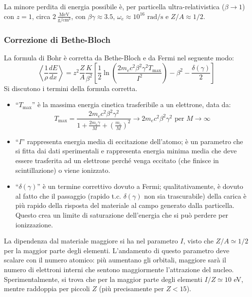 \documentclass[10pt, a4paper]{scrartcl}
\numberwithin{equation}{subsection}
\theoremstyle{style1}
\begin{document}
La minore perdita di energia possibile \`e, per particella ultra-relativistica ($\beta \to 1$) con $z=1$, circa $2 \ \frac{\text{MeV}}{\text{g} / \text{cm}^2}$, con $\beta \gamma\approx 3.5$, $\omega_e \approx 10^{16} \text{ rad} / \text{s}$ e $Z / A \approx 1 / 2$.


\subsubsection{Correzione di Bethe-Bloch }

La formula di Bohr \`e corretta da Bethe-Bloch e da Fermi nel seguente modo:
\begin{equation}
	\left\langle \frac{1}{\rho } \frac{d E}{d x}  \right\rangle = z^2 \frac{Z}{A} \frac{K}{\beta ^2} \left[ \frac{1}{2} \ln \left(\frac{2 m_e c^2 \beta ^2 \gamma^2 T_\text{max}}{I^2}\right)  - \beta ^2 - \frac{\delta (\gamma)}{2} \right] 
\end{equation}
Si discutono i termini della formula corretta.
\begin{itemize}
	\item ``$T_\text{max}$'' \`e la massima energia cinetica trasferibile a un elettrone, data da:
		\begin{equation}
			T_\text{max} = \frac{2m_e c^2 \beta ^2 \gamma^2}{1 + \frac{2 m_e \gamma}{M} + \left(\frac{m_e}{M}\right) ^2} \to 2 m_e c^2 \beta ^2 \gamma^2 \text{ per } M \to \infty
		\end{equation}
	\item ``$I$'' rappresenta energia media di eccitazione dell'atomo; \`e un parametro che si fitta dai dati sperimentali e rappresenta energia minima media che deve essere trasferita ad un elettrone perch\'e venga eccitato (che finisce in scintillazione) o viene ionizzato.
\item ``$\delta (\gamma)$'' \`e un termine correttivo dovuto a Fermi; qualitativamente, \`e dovuto al fatto che il passaggio (rapido t.c. $\delta (\gamma)$ non sia trascurabile) della carica \`e pi\`u rapido della risposta del materiale al campo generato dalla particella. Questo crea un limite di saturazione dell'energia che si pu\`o perdere per ionizzazione.
\end{itemize}
La dipendenza dal materiale maggiore si ha nel parametro $I$, visto che $Z / A \simeq 1 /2 $ per la maggior parte degli elementi. L'andamento di questo parametro deve scalare con il numero atomico: pi\`u aumentano gli orbitali, maggiore sar\`a il numero di elettroni interni che sentono maggiormente l'attrazione del nucleo. Sperimentalmente, si trova che per la maggior parte degli elementi $I / Z \simeq 10 $ eV, mentre raddoppia per piccoli $Z$ (pi\`u precisamente per $Z < 15$).
\end{document}
